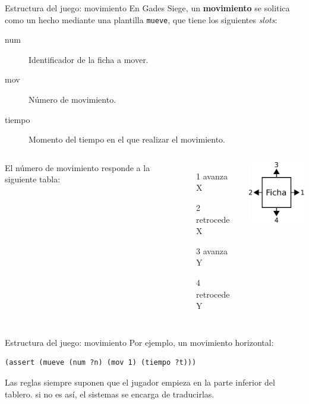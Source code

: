 \documentclass[smaller,spanish,xcolor=svgnames]{beamer}
\begin{document}
\begin{frame}[fragile]{Estructura del juego: movimiento}
  En Gades Siege, un \textbf{movimiento} se solitica como un hecho mediante
  una plantilla \texttt{mueve}, que tiene los siguientes \textit{slots}:

  \begin{description}
  \item[num] Identificador de la ficha a mover.
  \item[mov] Número de movimiento.
  \item[tiempo] Momento del tiempo en el que realizar el movimiento.
  \end{description}

  \begin{columns}[c]
    {\small
      El número de movimiento responde a la siguiente tabla:
      \begin{itemize}
      \item[1] avanza X
      \item[2] retrocede X
      \item[3] avanza Y
      \item[4] retrocede Y
      \end{itemize}}

    \begin{center}
      \includegraphics[width=1.2in]{img/diagrama_movimientos}      
    \end{center}

  \end{columns}



\end{frame}

\begin{frame}[fragile]{Estructura del juego: movimiento}
  Por ejemplo, un movimiento horizontal:
\begin{verbatim}
(assert (mueve (num ?n) (mov 1) (tiempo ?t)))
\end{verbatim}

  Las reglas siempre suponen que el jugador empieza en la parte inferior del tablero. si no es así, el sistemas se encarga de traducirlas.
\end{frame}
\end{document}
